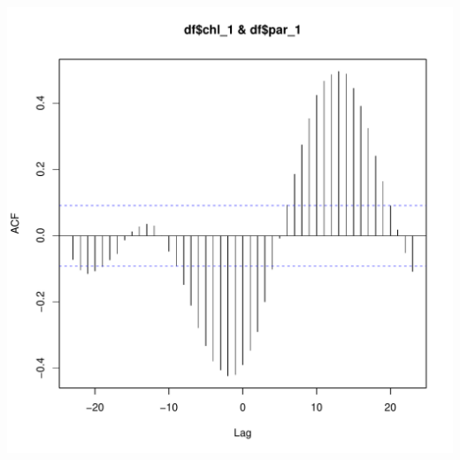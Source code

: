\documentclass{article}\usepackage[]{graphicx}\usepackage[]{color}
\makeatletter
\def\maxwidth{ %
  \ifdim\Gin@nat@width>\linewidth
    \linewidth
  \else
    \Gin@nat@width
  \fi
}
\newenvironment{knitrout}{}{} %
\makeatother
\begin{document}
\begin{knitrout}
\includegraphics[width=\maxwidth]{figure/unnamed-chunk-15-2} 

\end{knitrout}
\end{document}
